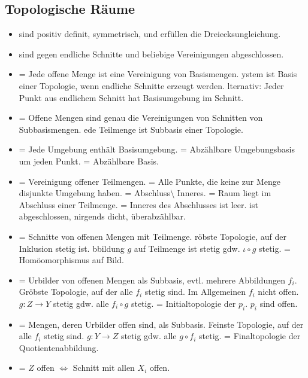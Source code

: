 \documentclass[8pt]{extarticle}
\begin{document}
\subsection*{Topologische Räume}
\begin{itemize}
	\item {} sind positiv definit, symmetrisch, und erfüllen die Dreiecksungleichung.
	\item {} sind gegen endliche Schnitte und beliebige Vereinigungen abgeschlossen.
	\item {} = Jede offene Menge ist eine Vereinigung von Basismengen. ystem ist Basis einer Topologie, wenn endliche Schnitte erzeugt werden. lternativ: Jeder Punkt aus endlichem Schnitt hat Basisumgebung im Schnitt.
	\item {} = Offene Mengen sind genau die Vereinigungen von Schnitten von Subbasismengen. ede Teilmenge ist Subbasis einer Topologie.
	\item {} = Jede Umgebung enthält Basisumgebung.  = Abzählbare Umgebungsbasis um jeden Punkt.  = Abzählbare Basis.
	\item {} = Vereinigung offener Teilmengen.  = Alle Punkte, die keine zur Menge disjunkte Umgebung haben.  = Abschluss$\setminus$ Inneres.  = Raum liegt im Abschluss einer Teilmenge.  = Inneres des Abschlusses ist leer.  ist abgeschlossen, nirgends dicht, überabzählbar.
	\item {} = Schnitte von offenen Mengen mit Teilmenge. röbste Topologie, auf der Inklusion stetig ist. bbildung $g$ auf Teilmenge ist stetig gdw. $\iota \circ g$ stetig.  = Homöomorphismus auf Bild.
	\item {} = Urbilder von offenen Mengen als Subbasis, evtl. mehrere Abbildungen $f_i$. Gröbste Topologie, auf der alle $f_i$ stetig sind. Im Allgemeinen $f_i$ nicht offen. $g : Z \to Y$ stetig gdw. alle $f_i \circ g$ stetig.
	 = Initialtopologie der $p_i$. $p_i$ sind offen.
	\item {} = Mengen, deren Urbilder offen sind, als Subbasis. Feinste Topologie, auf der alle $f_i$ stetig sind. $g : Y \to Z$ stetig gdw. alle $g \circ f_i$ stetig.  = Finaltopologie der Quotientenabbildung.
	\item {} = $Z$ offen $\Leftrightarrow$ Schnitt mit allen $X_i$ offen.
\end{itemize}
\end{document}
